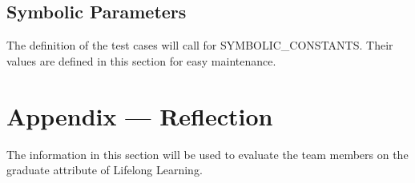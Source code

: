\documentclass[12pt, titlepage]{article}
\begin{document}
\subsection{Symbolic Parameters}

The definition of the test cases will call for SYMBOLIC\_CONSTANTS.
Their values are defined in this section for easy maintenance.


\newpage{}
\section*{Appendix --- Reflection}

The information in this section will be used to evaluate the team members on the
graduate attribute of Lifelong Learning.


\end{document}
